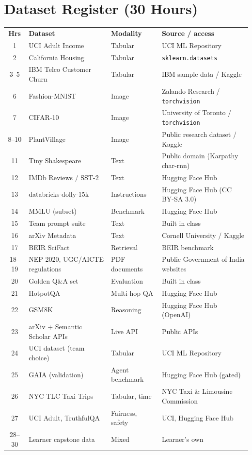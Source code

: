 \documentclass[11pt,a4paper]{article}
\begin{document}


\section{Dataset Register (30 Hours)}
\small
{}
\begin{tabularx}{\linewidth}{@{}c L{4.3cm} L{2.2cm} Y@{}}
\color{gold}\sffamily\bfseries Hrs & \color{gold}\sffamily\bfseries Dataset & \color{gold}\sffamily\bfseries Modality & \color{gold}\sffamily\bfseries Source / access\\
1     & UCI Adult Income & Tabular & UCI ML Repository\\
2     & California Housing & Tabular & \texttt{sklearn.datasets}\\
3--5  & IBM Telco Customer Churn & Tabular & IBM sample data / Kaggle\\
6     & Fashion-MNIST & Image & Zalando Research / \texttt{torchvision}\\
7     & CIFAR-10 & Image & University of Toronto / \texttt{torchvision}\\
8--10 & PlantVillage & Image & Public research dataset / Kaggle\\
11    & Tiny Shakespeare & Text & Public domain (Karpathy char-rnn)\\
12    & IMDb Reviews / SST-2 & Text & Hugging Face Hub\\
13    & databricks-dolly-15k & Instructions & Hugging Face Hub (CC BY-SA 3.0)\\
14    & MMLU (subset) & Benchmark & Hugging Face Hub\\
15    & Team prompt suite & Text & Built in class\\
16    & arXiv Metadata & Text & Cornell University / Kaggle\\
17    & BEIR SciFact & Retrieval & BEIR benchmark\\
18--19 & NEP 2020, UGC/AICTE regulations & PDF documents & Public Government of India websites\\
20    & Golden Q\&A set & Evaluation & Built in class\\
21    & HotpotQA & Multi-hop QA & Hugging Face Hub\\
22    & GSM8K & Reasoning & Hugging Face Hub (OpenAI)\\
23    & arXiv + Semantic Scholar APIs & Live API & Public APIs\\
24    & UCI dataset (team choice) & Tabular & UCI ML Repository\\
25    & GAIA (validation) & Agent benchmark & Hugging Face Hub (gated)\\
26    & NYC TLC Taxi Trips & Tabular, time & NYC Taxi \& Limousine Commission\\
27    & UCI Adult, TruthfulQA & Fairness, safety & UCI, Hugging Face Hub\\
28--30 & Learner capstone data & Mixed & Learner's own\\
\end{tabularx}
\end{document}
